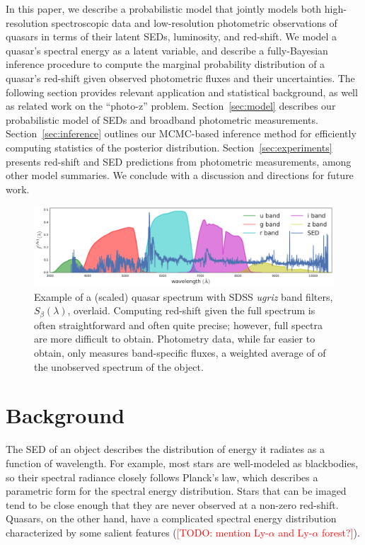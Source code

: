 \documentclass{article}
\newcommand{\red}[1]{\textcolor{red}{[TODO: #1]}}
\begin{document}
In this paper, we describe a probabilistic model that jointly models both high-resolution spectroscopic data and low-resolution photometric observations of quasars in terms of their latent SEDs, luminosity, and red-shift.  We model a quasar's spectral energy as a latent variable, and describe a fully-Bayesian inference procedure to compute the marginal probability distribution of a quasar's red-shift given observed photometric fluxes and their uncertainties.  The following section provides relevant application and statistical background, as well as related work on the ``photo-z'' problem.  Section~\ref{sec:model} describes our probabilistic model of SEDs and broadband photometric measurements.  Section~\ref{sec:inference} outlines our MCMC-based inference method for efficiently computing statistics of the posterior distribution. Section~\ref{sec:experiments} presents red-shift and SED predictions from photometric measurements, among other model summaries.  We conclude with a discussion and directions for future work.  


\begin{figure}[ht]
\vskip 0.2in
\begin{center}
\centerline{\includegraphics[width=2\columnwidth]{../figs/quasar_spectrum_sdss_filters}}
\caption{Example of a (scaled) quasar spectrum with SDSS \emph{ugriz} band filters, $S_{\beta}(\lambda)$, overlaid.  Computing red-shift given the full spectrum is often straightforward and often quite precise; however, full spectra are more difficult to obtain.  Photometry data, while far easier to obtain, only measures band-specific fluxes, a weighted average of of the unobserved spectrum of the object. }
\label{fig:filters}
\end{center}
\vskip -0.2in
\end{figure} 


\section{Background}
\label{sec:background}
The SED of an object describes the distribution of energy it radiates as a function of wavelength.  
For example, most stars are well-modeled as blackbodies, so their spectral radiance closely follows Planck's law, which describes a parametric form for the spectral energy distribution.  Stars that can be imaged tend to be close enough that they are never observed at a non-zero red-shift. 
Quasars, on the other hand, have a complicated spectral energy distribution characterized by some salient features (\red{mention Ly-$\alpha$ and Ly-$\alpha$ forest?}).
\end{document}
